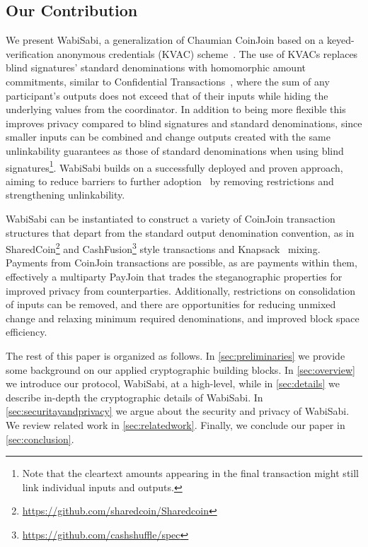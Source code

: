 \documentclass[a4paper]{article}
\begin{document}
\subsection{Our Contribution}

We present WabiSabi, a generalization of Chaumian CoinJoin based on a keyed-verification anonymous credentials (KVAC) scheme~\cite{chase2019signal}. The use of KVACs replaces blind signatures' standard denominations with homomorphic amount commitments, similar to Confidential Transactions~\cite{maxwell2016confidential}, where the sum of any participant's outputs does not exceed that of their inputs while hiding the underlying values from the coordinator. In addition to being more flexible this improves privacy compared to blind signatures and standard denominations, since smaller inputs can be combined and change outputs created with the same unlinkability guarantees as those of standard denominations when using blind signatures\footnote{Note that the cleartext amounts appearing in the final transaction might still link individual inputs and outputs.}. WabiSabi builds on a successfully deployed and proven approach, aiming to reduce barriers to further adoption~\cite{dingledine2006anonymity} by removing restrictions and strengthening unlinkability.

WabiSabi can be instantiated to construct a variety of CoinJoin transaction structures that depart from the standard output denomination convention, as in SharedCoin\footnote{\url{https://github.com/sharedcoin/Sharedcoin}} and CashFusion\footnote{\url{https://github.com/cashshuffle/spec}} style transactions and Knapsack~\cite{maurer2017anonymous} mixing. Payments from CoinJoin transactions are possible, as are payments within them, effectively a multiparty PayJoin that trades the steganographic properties for improved privacy from counterparties. Additionally, restrictions on consolidation of inputs can be removed, and there are opportunities for reducing unmixed change and relaxing minimum required denominations, and improved block space efficiency.

The rest of this paper is organized as follows. In \cref{sec:preliminaries} we provide some background on our applied cryptographic building blocks. In \cref{sec:overview} we introduce our protocol, WabiSabi, at a high-level, while in \cref{sec:details} we describe in-depth the cryptographic details of WabiSabi. In \cref{sec:securitayandprivacy} we argue about the security and privacy of WabiSabi.
We review related work in \cref{sec:relatedwork}. Finally, we conclude our paper in \cref{sec:conclusion}.
\end{document}
